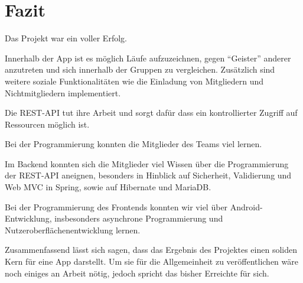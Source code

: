 \section{Fazit}\label{fazit}
Das Projekt war ein voller Erfolg.

Innerhalb der App ist es möglich Läufe aufzuzeichnen, gegen ``Geister'' anderer anzutreten und sich innerhalb der Gruppen zu vergleichen. Zusätzlich sind weitere soziale Funktionalitäten wie die Einladung von Mitgliedern und Nichtmitgliedern implementiert.

Die REST-API tut ihre Arbeit und sorgt dafür dass ein kontrollierter Zugriff auf Ressourcen möglich ist.

Bei der Programmierung konnten die Mitglieder des Teams viel lernen.

Im Backend konnten sich die Mitglieder viel Wissen über die Programmierung der REST-API aneignen, besonders in Hinblick auf Sicherheit, Validierung und Web MVC in Spring, sowie auf Hibernate und MariaDB. 

Bei der Programmierung des Frontends konnten wir viel über Android-Entwicklung, insbesonders asynchrone Programmierung und Nutzeroberflächenentwicklung lernen.

Zusammenfassend lässt sich sagen, dass das Ergebnis des Projektes einen soliden Kern für eine App darstellt. Um sie für die Allgemeinheit zu veröffentlichen wäre noch einiges an Arbeit nötig, jedoch spricht das bisher Erreichte für sich.